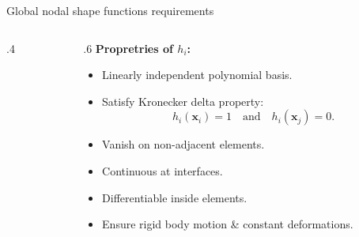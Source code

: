\documentclass[aspectratio=169]{beamer}
\begin{document}
{\begin{frame}{Global nodal shape functions requirements}
\begin{columns}[T]
\begin{column}{.4\textwidth}
    \end{column}
    \begin{column}{.6\textwidth}
      \textbf{Propretries of $h_i$:}
      \begin{itemize}
        \item Linearly independent polynomial basis.
        \item Satisfy Kronecker delta property:
              $$ h_i(\mathbf{x}_i) = 1\quad\text{and} \quad h_i(\mathbf{x}_j) = 0.$$
        \item Vanish on non-adjacent elements.
        \item Continuous at interfaces.
        \item Differentiable inside elements.
        \item Ensure rigid body motion \& constant deformations.
      \end{itemize}
    \end{column}
  \end{columns}
\end{frame}



}
\end{document}
